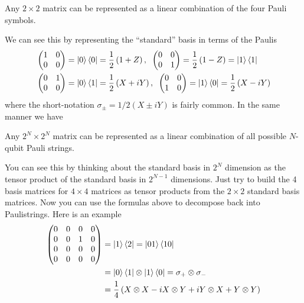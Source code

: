 \begin{theorem*}
Any $2\times 2$ matrix can be represented as a linear combination of the four Pauli symbols.
\end{theorem*}
We can see this by representing the ``standard'' basis in terms of the Paulis
\begin{align}
    &\begin{pmatrix}
        1 & 0 \\0 & 0
    \end{pmatrix} = \ket{0}\bra{0}=  \frac{1}{2}\left(1 + Z\right),\;\;
    \begin{pmatrix}
    0 & 0 \\0 & 1
    \end{pmatrix} = \frac{1}{2}\left(1 - Z\right) = \ket{1}\bra{1}\\
    &\begin{pmatrix}
        0 & 1 \\0 & 0
    \end{pmatrix} = \ket{0}\bra{1} =  \frac{1}{2}\left(X + iY\right),\;\;    \begin{pmatrix}
        0 & 0 \\1 & 0
    \end{pmatrix}  = \ket{1}\bra{0}= \frac{1}{2}\left(X - iY\right) 
\end{align}
where the short-notation $\sigma_{\pm} = 1/2(X \pm iY)$ is fairly common.
In the same manner we have
\begin{theorem*}
Any $2^N\times 2^N$ matrix can be represented as a linear combination of all possible $N$-qubit Pauli strings.
\end{theorem*}
You can see this by thinking about the standard basis in $2^N$ dimension as the tensor product of the standard basis in $2^{N-1}$ dimensions. Just try to build the 4 basis matrices for $4\times 4$ matrices as tensor products from the $2\times 2$ standard basis matrices. Now you can use the formulas above to decompose back into Paulistrings. Here is an example
\begin{align}
    \begin{pmatrix}
        0 & 0 & 0 & 0\\
0 & 0 & 1 & 0\\
0 & 0 & 0 & 0\\
0 & 0 & 0 & 0\\
    \end{pmatrix} &= \ket{1}\bra{2} = \ket{01}\bra{10}\nonumber\\ 
    &=\ket{0}\bra{1}\otimes\ket{1}\bra{0} = \sigma_+ \otimes \sigma_- \nonumber\\
    &= \frac{1}{4}\left(X\otimes X - iX\otimes Y + i Y\otimes X + Y\otimes Y\right)
\end{align}
